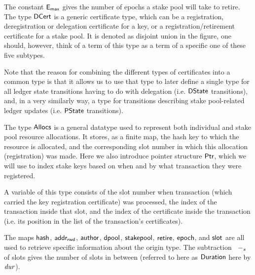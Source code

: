 The constant $\mathsf{E_{max}}$ gives the number of epochs a stake pool will take to retire.
The type $\mathsf{DCert}$ is a generic certificate type, which can be a registration,
deregistration or delegation certificate for a key, or a registration/retirement
 certificate for a stake pool. It is denoted as disjoint union in the figure,
one should, however, think of a term of this type as a term of a specific
one of these five subtypes.

Note that the reason for combining the different types of
certificates into a common type is that it allows us to use that type to later
define a single type for all
ledger state transitions having to do with delegation (i.e. $\mathsf{DState}$
transitions),
and, in a very similarly
way, a type for transitions describing stake pool-related ledger updates
(i.e. $\mathsf{PState}$ transitions).

The type $\mathsf{Allocs}$ is a general datatype used to represent both individual and stake
pool resource allocations. It stores, as a finite map, the hash key to which the resource is
allocated, and the corresponding slot number in which this allocation
(registration) was made. Here we also introduce pointer structure
$\mathsf{Ptr}$, which we will use to index stake keys based on
when and by what transaction they were registered.

A variable of this type consists of
the slot number when transaction (which carried the key registration certificate)
was processed, the index of the transaction inside that slot, and the index
of the certificate inside the transaction (i.e. its position in the list of
the transaction's certificates).

The maps $\mathsf{hash}$, $\mathsf{addr_{rwd}}$, $\mathsf{author}$, $\mathsf{dpool}$,
$\mathsf{stakepool}$,
$\mathsf{retire}$, $\mathsf{epoch}$, and $\mathsf{slot}$ are all used to
retrieve specific information about the origin type. The subtraction $\mathit{}~-_{s}~\mathit{}$
of slots gives the number of slots in between (referred to here as
$\mathsf{Duration}$ here by $\mathit{dur}$).

